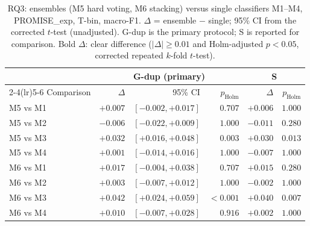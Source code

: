 \begin{table}[t]
\centering
\caption{RQ3: ensembles (M5 hard voting, M6 stacking) versus single classifiers M1--M4, PROMISE\_exp, T-bin, macro-F1. $\Delta$ = ensemble $-$ single; 95\% CI from the corrected $t$-test (unadjusted). G-dup is the primary protocol; S is reported for comparison. Bold $\Delta$: clear difference ($|\Delta| \geq 0.01$ and Holm-adjusted $p < 0.05$, corrected repeated $k$-fold $t$-test).}
\label{tab:rq3}
\small
\setlength{\tabcolsep}{4pt}
\begin{tabular}{lrrrrr}
\toprule
& \multicolumn{3}{c}{G-dup (primary)} & \multicolumn{2}{c}{S} \\
\cmidrule(lr){2-4}\cmidrule(lr){5-6}
Comparison & $\Delta$ & 95\% CI & $p_{\mathrm{Holm}}$ & $\Delta$ & $p_{\mathrm{Holm}}$ \\
\midrule
M5 vs M1 & $+0.007$ & $[-0.002, +0.017]$ & $0.707$ & $+0.006$ & $1.000$ \\
M5 vs M2 & $-0.006$ & $[-0.022, +0.009]$ & $1.000$ & $-0.011$ & $0.280$ \\
M5 vs M3 & $\mathbf{+0.032}$ & $[+0.016, +0.048]$ & $0.003$ & $\mathbf{+0.030}$ & $0.013$ \\
M5 vs M4 & $+0.001$ & $[-0.014, +0.016]$ & $1.000$ & $-0.007$ & $1.000$ \\
M6 vs M1 & $+0.017$ & $[-0.004, +0.038]$ & $0.707$ & $+0.015$ & $0.280$ \\
M6 vs M2 & $+0.003$ & $[-0.007, +0.012]$ & $1.000$ & $-0.002$ & $1.000$ \\
M6 vs M3 & $\mathbf{+0.042}$ & $[+0.024, +0.059]$ & $<0.001$ & $\mathbf{+0.040}$ & $0.007$ \\
M6 vs M4 & $+0.010$ & $[-0.007, +0.028]$ & $0.916$ & $+0.002$ & $1.000$ \\
\bottomrule
\end{tabular}
\end{table}
